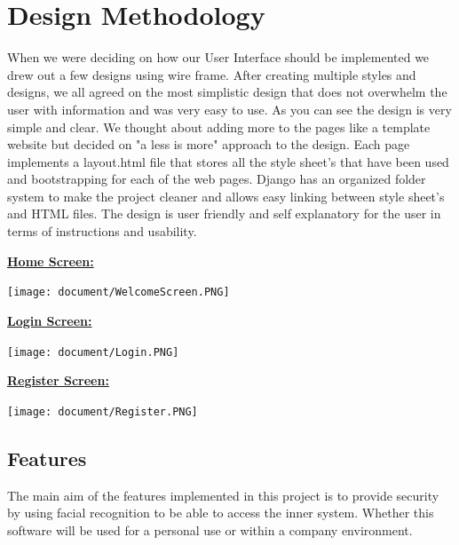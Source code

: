 \documentclass{article}
\begin{document}
\begin{flushleft}
\section{Design Methodology}
When we were deciding on how our User Interface should be implemented we drew out a few designs using wire frame. After creating multiple styles and designs, we all agreed on the most simplistic design that does not overwhelm the user with information and was very easy to use. As you can see the design is very simple and clear. We thought about adding more to the pages like a template website but decided on "a less is more" approach to the design. Each page implements a layout.html file that stores all the style sheet's that have been used and bootstrapping for each of the web pages. Django has an organized folder system to make the project cleaner and allows easy linking between style sheet's and HTML files. The design is user friendly and self explanatory for the user in terms of instructions and usability. 
\newline
\newline
\newline
\newline


\begin{flushleft}
\textbf{\underline{Home Screen:}}
\end{flushleft}

\texttt{[image: document/WelcomeScreen.PNG]}

\begin{flushleft}
\textbf{\underline{Login Screen:}}
\end{flushleft}

\texttt{[image: document/Login.PNG]}
\newline
\newpage
\begin{flushleft}
\textbf{\underline{Register Screen:}}
\end{flushleft}

\texttt{[image: document/Register.PNG]}
\label{fig:WebsiteImages}
\newline
\newline
\newline

\begin{flushleft}
\section{Features}
The main aim of the features implemented in this project is to provide security by using facial recognition to be able to access the inner system. Whether this software will be used for a personal use or within a company environment.
\newline


\end{flushleft}
\end{flushleft}
\end{document}
